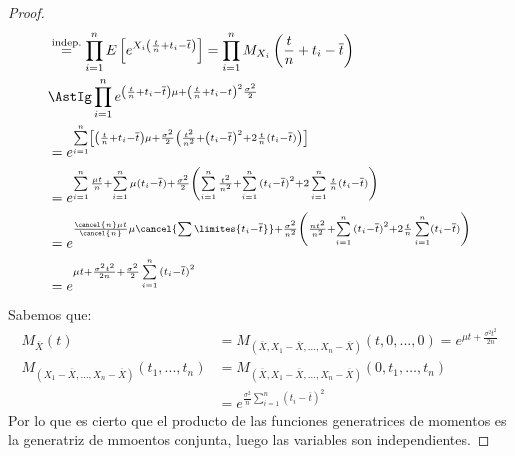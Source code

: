 \begin{prop}
\begin{proof}
\begin{align*}
                                                                                                 &\stackrel{\text{indep.}}{=} \prod_{i=1}^{n} E\left[e^{X_i\left(\frac{t}{n}+t_i - \overline{t}\right)}\right] = \prod_{i=1}^{n} M_{X_i}\left(\frac{t}{n}+t_i - \overline{t}\right) \\
                                                                                                 &\AstIg \prod_{i=1}^{n} e^{\left(\frac{t}{n}+t_i-\overline{t}\right)\mu + {\left(\frac{t}{n}+t_i - t\right)}^{2}\frac{\sigma^2}{2}} \\
                                                                                                 &=e ^{\sum\limits_{i=1}^n \left[\left(\frac{t}{n}+t_i - \overline{t}\right)\mu + \frac{\sigma^2}{2} \left(\frac{t^2}{n^2} + {\left(t_i - \overline{t}\right)}^{2} + 2\frac{t}{n}(t_i - \overline{t})\right)\right]}  \\
                                                                                                 &= e^{\sum\limits_{i=1}^n \frac{\mu t}{n} + \sum\limits_{i=1}^n \mu (t_i-\overline{t}) + \frac{\sigma^2}{2}\left(\sum\limits_{i=1}^n \frac{t^2}{n^2} + \sum\limits_{i=1}^n {(t_i - \overline{t})}^{2} + 2\sum\limits_{i=1}^n \frac{t}{n}(t_i - \overline{t}) \right)} \\
                                                                                                 &= e^{\frac{\cancel{n}\mu t}{\cancel{n}} \mu \cancel{\sum\limites{t_i - \overline{t}}} + \frac{\sigma^2}{n^2} \left(\frac{nt^2}{n^2} + \sum\limits_{i=1}^n {(t_i - \overline{t})}^{2} + 2\frac{t}{n}\sum\limits_{i=1}^n (t_i - \overline{t})\right)} \\
                                                                                                 &= e^{\mu t + \frac{\sigma^2t^2}{2n} + \frac{\sigma^2}{2}\sum\limits_{i=1}^n {(t_i - \overline{t})}^2{}}
        \end{align*}
        Sabemos que:
        \begin{align*}
            M_{\overline{X}}(t) &= M_{\left(\overline{X},X_1 - \overline{X}, \ldots, X_n - \overline{X}\right)}(t,0, ..., 0) = e^{\mu t + \frac{\sigma^2t^2}{2n}} \\
            M_{(X_1 - \overline{X}, \ldots, X_n - \overline{X})}(t_1, ..., t_n) &= M_{(\overline{X},X_1 - \overline{X}, \ldots, X_n - \overline{X})}(0,t_1, \ldots, t_n) \\
                                &= e^{\frac{\sigma^2}{n}\sum\limits_{i=1}^n {(t_i - \overline{t})}^{2}}
        \end{align*}
        Por lo que es cierto que el producto de las funciones generatrices de momentos es la generatriz de mmoentos conjunta, luego las variables son independientes.
    \end{proof}
\end{prop}

